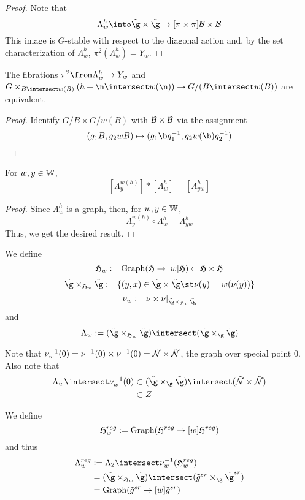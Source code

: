 \begin{proof}
  Note that \[
    \Lambda_w^h \into \tilde{\g} \times \tilde{\g} \to[\pi \times \pi]
    \cB \times \cB
  \]
  This image is \(G\)-stable with respect to the diagonal action and,
  by the set characterization of \(\Lambda_w^h\), \(\pi^2(\Lambda_w^h) = Y_w\).
\end{proof}
\begin{lem}
  The fibrations \(\pi^2 \from \Lambda_w^h \to Y_w\) and \(G\times_{B
    \intersect w(B)}(h + \n \intersect w(\n)) \to G/(B \intersect
  w(B))\) are equivalent. 
\end{lem}
\begin{proof}
  Identify \(G/B \times G/w(B)\) with \(\mathcal{B} \times \mathcal{B}\) via the
  assignment \[
    (g_1 B, g_2 w B) \mapsto (g_1 \b g_1^{-1}, g_2 w(\b) g_2^{-1})
  \]
\end{proof}
\begin{lem}
  For \(w,y \in \mathbb{W}\), \[
    [\Lambda_y^{w(h)}] * [\Lambda_w^h] = [\Lambda_{yw}^h]
  \]
\end{lem}
\begin{proof}
   Since \(\Lambda_w^h\) is a graph, then, for \(w,y \in \mathbb{W}\), \[
     \Lambda_y^{w(h)} \circ \Lambda_w^h = \Lambda_{yw}^h
   \]
   Thus, we get the desired result.
\end{proof}
\begin{defn}\label{w-restrictions}
  We define \[
    \mathfrak{H}_w := \operatorname{Graph}(\mathfrak{H} \to[w] \mathfrak{H}) \subset \mathfrak{H} \times \mathfrak{H}
  \]
  \[
    \tilde{\g} \times_{\ah_w} \tilde{\g} := \{(y,x) \in \tilde{\g}
    \times \tilde{\g} \st \nu(y) = w(\nu(y))\}
  \]
  \[
    \nu_w := \nu \times \nu |_{\tilde{\g} \times_{\ah_w} \tilde{\g}}
  \]
  and \[
    \Lambda_w := (\tilde{\g} \times_{\ah_w} \tilde{\g}) \intersect
    (\tilde{\g} \times_\g \tilde{\g})
  \]
\end{defn}
\begin{rmk}
  Note that \(\nu_w^{-1}(0) = \nu^{-1}(0) \times \nu^{-1}(0) =
  \tilde{\mathcal{N}} \times \tilde{\mathcal{N}}\), the graph over special point
  \(0\). Also note that
  \begin{align*}
    \Lambda_w \intersect \nu_w^{-1}(0) & \subset (\tilde{\g} \times_\g
    \tilde{\g}) \intersect (\tilde{\cN} \times \tilde{\cN}) \\
    & \subset Z
  \end{align*}
\end{rmk}
\begin{defn}
  We define \[
    \mathfrak{H}_w^{reg} := \operatorname{Graph}(\mathfrak{H}^{reg} \to[w] \mathfrak{H}^{reg})
  \]
  and thus
  \begin{align*}
    \Lambda_w^{reg}
    & := \Lambda_2 \intersect \nu_w^{-1}(\ah_w^{reg}) \\
    & = (\tilde{\g} \times_{\ah_w} \tilde{\g}) \intersect
      (\tilde{g}^{sr} \times_\g \tilde{\g}^{sr}) \\
    & = \operatorname{Graph}(\tilde{g}^{sr} \to[w] \tilde{g}^{sr})
  \end{align*}
\end{defn}
